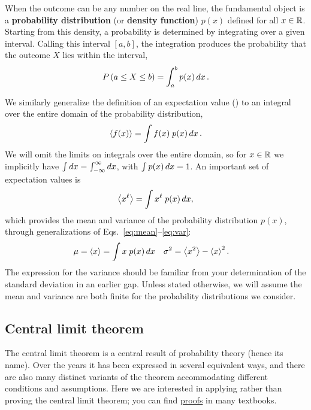 When the outcome can be any number on the real line, the fundamental object is a \textbf{probability distribution} (or \textbf{density function}) $p(x)$ defined for all $x \in \mathbb R$.
Starting from this density, a probability is determined by integrating over a given interval.
Calling this interval $[a, b]$, the integration produces the probability that the outcome $X$ lies within the interval,
\begin{equation*}
  P\left(a \leq X \leq b\right) = \int_a^b p(x) \mathop{dx}.
\end{equation*}

We similarly generalize the definition of an expectation value () to an integral over the entire domain of the  probability distribution,
\begin{equation*}
  \left\langle f(x) \right\rangle = \int f(x) \; p(x) \mathop{dx}.
\end{equation*}
We will omit the limits on integrals over the entire domain, so for $x \in \mathbb R$ we implicitly have $\int \mathop{dx} = \int_{-\infty}^{\infty} \mathop{dx}$, with $\int p(x) \mathop{dx} = 1$.
An important set of expectation values is
\begin{equation}
  \label{eq:expect_cont}
  \left\langle x^{\ell} \right\rangle = \int x^{\ell} \; p(x) \mathop{dx},
\end{equation}
which provides the mean and variance of the probability distribution $p(x)$, through generalizations of Eqs.~\ref{eq:mean}--\ref{eq:var}:
\begin{align}
  \label{eq:mean_var}
  \mu   & = \left\langle x \right\rangle = \int x \; p(x) \mathop{dx} &
  \sigma^2 & = \left\langle x^2 \right\rangle - \left\langle x \right\rangle^2.
\end{align}
The expression for the variance should be familiar from your determination of the standard deviation in an earlier gap.
Unless stated otherwise, we will assume the mean and variance are both finite for the probability distributions we consider.



\subsection{\label{sec:CLT}Central limit theorem}
The central limit theorem is a central result of probability theory (hence its name).
Over the years it has been expressed in several equivalent ways, and there are also many distinct variants of the theorem accommodating different conditions and assumptions.
Here we are interested in applying rather than proving the central limit theorem; you can find \href{https://en.wikipedia.org/wiki/Central_limit_theorem#Proof_of_classical_CLT}{proofs} in many textbooks.

